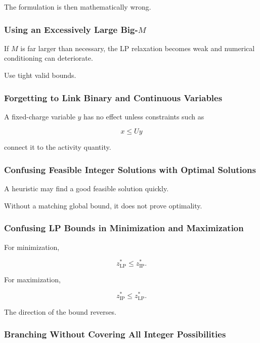 The formulation is then mathematically wrong.

\subsubsection{Using an Excessively Large Big-\(M\)}

If \(M\) is far larger than necessary, the LP relaxation becomes weak and
numerical conditioning can deteriorate.

Use tight valid bounds.

\subsubsection{Forgetting to Link Binary and Continuous Variables}

A fixed-charge variable \(y\) has no effect unless constraints such as

\[
\boxed{
x\leq Uy
}
\]

connect it to the activity quantity.

\subsubsection{Confusing Feasible Integer Solutions with Optimal Solutions}

A heuristic may find a good feasible solution quickly.

Without a matching global bound, it does not prove optimality.

\subsubsection{Confusing LP Bounds in Minimization and Maximization}

For minimization,

\[
\boxed{
z_{\mathrm{LP}}^*
\leq
z_{\mathrm{IP}}^*.
}
\]

For maximization,

\[
\boxed{
z_{\mathrm{IP}}^*
\leq
z_{\mathrm{LP}}^*.
}
\]

The direction of the bound reverses.

\subsubsection{Branching Without Covering All Integer Possibilities}

